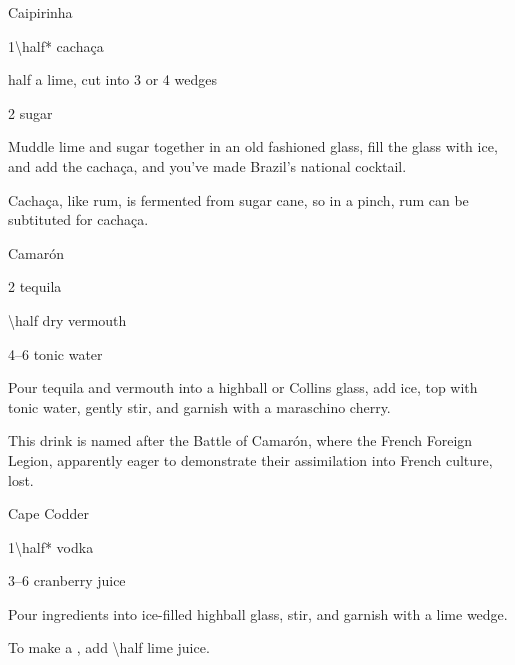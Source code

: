 \begin{Cocktail}{Caipirinha}
	\begin{Ingredients}
	\item \SI{1\half*}{\oz} cacha\c{c}a
	\item half a lime, cut into 3 or 4 wedges
	\item \SI{2}{\tsp} sugar
	\end{Ingredients}
	
	\begin{Instructions}
	Muddle lime and sugar together in an old fashioned glass, fill the glass with ice, and add the cacha\c{c}a, and you've made Brazil's national cocktail.
	
	Cacha\c{c}a, like rum, is fermented from sugar cane, so in a pinch, rum can be subtituted for cacha\c{c}a.
	\end{Instructions}
\end{Cocktail}

\begin{Cocktail*}{Camar\'{o}n}
	\begin{Ingredients}
	\item \SI{2}{\oz} tequila
	\item \SI{\half}{\oz} dry vermouth
	\item \SIrange{4}{6}{\oz} tonic water
	\end{Ingredients}
	
	\begin{Instructions}
	Pour tequila and vermouth into a highball or Collins glass, add ice, top with tonic water, gently stir, and garnish with a maraschino cherry.
	
	This drink is named after the Battle of Camar\'on, where the French Foreign Legion, apparently eager to demonstrate their assimilation into French culture, lost.
	\end{Instructions}
\end{Cocktail*}

\begin{Cocktail}{Cape Codder}
	\begin{Ingredients}
	\item \SI{1\half*}{\oz} vodka
	\item \SIrange{3}{6}{\oz} cranberry juice
	\end{Ingredients}
	
	\begin{Instructions}
	Pour ingredients into ice-filled highball glass, stir, and garnish with a lime wedge.
	
	To make a , add \SI{\half}{\oz} lime juice.
	\end{Instructions}
\end{Cocktail}


